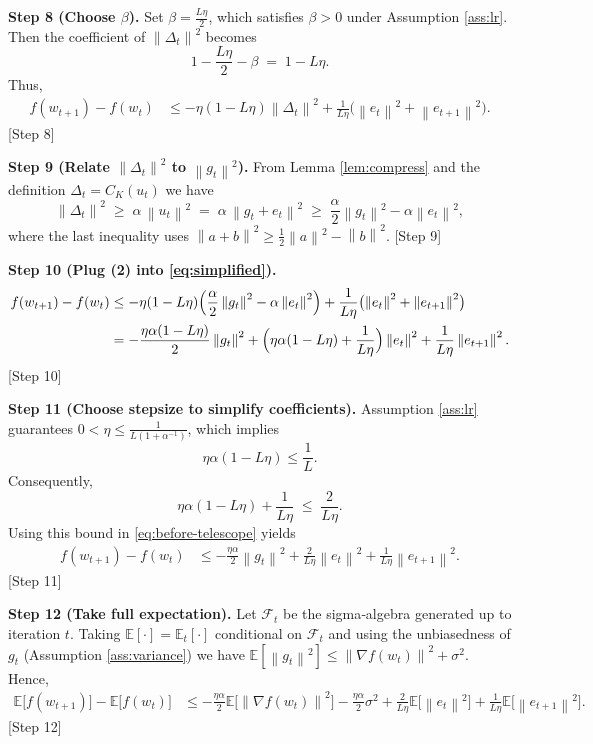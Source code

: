 \documentclass{article}
\newcommand{\E}{\mathbb{E}}
\newcommand{\norm}[1]{\left\|#1\right\|}
\begin{document}
\bigskip
\noindent\textbf{Step 8 (Choose $\beta$).}  
Set $\beta = \frac{L\eta}{2}$, which satisfies $\beta>0$ under Assumption \ref{ass:lr}. Then the coefficient of $\norm{\Delta_t}^{2}$ becomes
\[
1-\frac{L\eta}{2}-\beta \;=\; 1-L\eta.
\]
Thus,
\begin{align}
f(w_{t+1})-f(w_t)
&\le -\eta(1-L\eta)\norm{\Delta_t}^{2}
   +\frac{1}{L\eta}\bigl(\norm{e_{t}}^{2}+\norm{e_{t+1}}^{2}\bigr). \label{eq:simplified}
\end{align}
[Step 8]

\bigskip
\noindent\textbf{Step 9 (Relate $\norm{\Delta_t}^{2}$ to $\norm{g_t}^{2}$).}  
From Lemma \ref{lem:compress} and the definition $\Delta_t=C_{K}(u_t)$ we have
\[
\norm{\Delta_t}^{2}\;\ge\;\alpha\,\norm{u_t}^{2}
      \;=\;\alpha\,\norm{g_t+e_t}^{2}
      \;\ge\;\frac{\alpha}{2}\norm{g_t}^{2}
            -\alpha\norm{e_t}^{2}, \tag{2}
\]
where the last inequality uses $\norm{a+b}^{2}\ge\frac12\norm{a}^{2}-\norm{b}^{2}$.
[Step 9]

\bigskip
\noindent\textbf{Step 10 (Plug (2) into \eqref{eq:simplified}).}  
\begin{align}
f(w_{t+1})-f(w_t)
&\le -\eta(1-L\eta)\Bigl(\frac{\alpha}{2}\norm{g_t}^{2}
                         -\alpha\norm{e_t}^{2}\Bigr)
   +\frac{1}{L\eta}\bigl(\norm{e_{t}}^{2}+\norm{e_{t+1}}^{2}\bigr) \nonumber\\
&= -\frac{\eta\alpha(1-L\eta)}{2}\norm{g_t}^{2}
   +\Bigl(\eta\alpha(1-L\eta)+\frac{1}{L\eta}\Bigr)\norm{e_t}^{2}
   +\frac{1}{L\eta}\norm{e_{t+1}}^{2}. \label{eq:before-telescope}
\end{align}
[Step 10]

\bigskip
\noindent\textbf{Step 11 (Choose stepsize to simplify coefficients).}  
Assumption \ref{ass:lr} guarantees $0<\eta\le\frac{1}{L(1+\alpha^{-1})}$, which implies
\[
\eta\alpha(1-L\eta)\le\frac{1}{L}.
\]
Consequently,
\[
\eta\alpha(1-L\eta)+\frac{1}{L\eta}\;\le\;\frac{2}{L\eta}.
\]
Using this bound in \eqref{eq:before-telescope} yields
\begin{align}
f(w_{t+1})-f(w_t)
&\le -\frac{\eta\alpha}{2}\norm{g_t}^{2}
   +\frac{2}{L\eta}\norm{e_t}^{2}
   +\frac{1}{L\eta}\norm{e_{t+1}}^{2}. \label{eq:telescoping}
\end{align}
[Step 11]

\bigskip
\noindent\textbf{Step 12 (Take full expectation).}  
Let $\mathcal{F}_t$ be the sigma‑algebra generated up to iteration $t$. Taking $\E[\cdot]=\E_{t}[\cdot]$ conditional on $\mathcal{F}_t$ and using the unbiasedness of $g_t$ (Assumption \ref{ass:variance}) we have $\E[\norm{g_t}^{2}]\le \norm{\nabla f(w_t)}^{2}+\sigma^{2}$. Hence,
\begin{align}
\E\!\bigl[f(w_{t+1})\bigr]-\E\!\bigl[f(w_t)\bigr]
&\le -\frac{\eta\alpha}{2}\E\!\bigl[\norm{\nabla f(w_t)}^{2}\bigr]
   -\frac{\eta\alpha}{2}\sigma^{2}
   +\frac{2}{L\eta}\E\!\bigl[\norm{e_t}^{2}\bigr]
   +\frac{1}{L\eta}\E\!\bigl[\norm{e_{t+1}}^{2}\bigr]. \label{eq:exp-step}
\end{align}
[Step 12]
\end{document}
